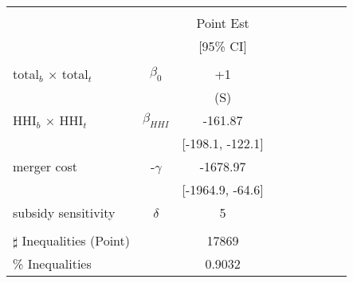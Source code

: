 \begin{tabular}{@{\extracolsep{5pt}}lcc}
\toprule 
 &  &  \\
 &  & Point Est \\
 &  & [95\% CI] \\
\midrule 
 &  &  \\
total$_{b}$ $\times$ total$_{t}$ & $\beta_0$ & +1 \\
 &  & (S) \\
HHI$_{b}$ $\times$ HHI$_{t}$ & $\beta_{HHI}$ & -161.87 \\
 &  & [-198.1, -122.1] &  &  &  &  &  &  &  \\
merger cost & -$\gamma$ & -1678.97 \\
 &  & [-1964.9, -64.6] \\
subsidy sensitivity & $\delta$ & 5 \\
 &  &  &  &  &  &  &  &  &  \\
\hline 
$\sharp$ Inequalities (Point) &  & 17869 \\
\% Inequalities &  & 0.9032 \\
\bottomrule 
\end{tabular}
